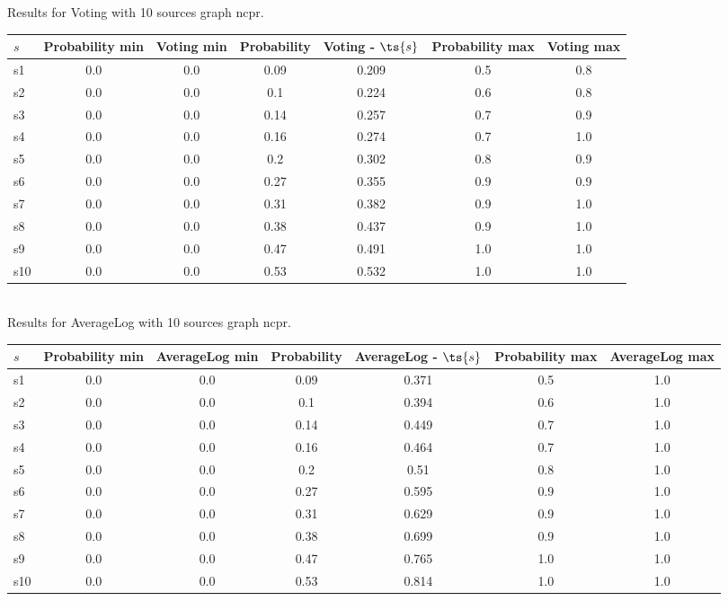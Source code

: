 \documentclass{article}
\begin{document}
\noindent Results for Voting with 10 sources graph ncpr.

\noindent\begin{tabular}{|l|c|c|c|c|c|c|}
\hline
$s$& Probability min & Voting min & Probability & Voting - $\ts{s}$ & Probability max & Voting max\\
\hline
s1 &0.0 & 0.0 & 0.09 & 0.209 & 0.5 & 0.8\\
\hline
s2 &0.0 & 0.0 & 0.1 & 0.224 & 0.6 & 0.8\\
\hline
s3 &0.0 & 0.0 & 0.14 & 0.257 & 0.7 & 0.9\\
\hline
s4 &0.0 & 0.0 & 0.16 & 0.274 & 0.7 & 1.0\\
\hline
s5 &0.0 & 0.0 & 0.2 & 0.302 & 0.8 & 0.9\\
\hline
s6 &0.0 & 0.0 & 0.27 & 0.355 & 0.9 & 0.9\\
\hline
s7 &0.0 & 0.0 & 0.31 & 0.382 & 0.9 & 1.0\\
\hline
s8 &0.0 & 0.0 & 0.38 & 0.437 & 0.9 & 1.0\\
\hline
s9 &0.0 & 0.0 & 0.47 & 0.491 & 1.0 & 1.0\\
\hline
s10 &0.0 & 0.0 & 0.53 & 0.532 & 1.0 & 1.0\\
\hline
\end{tabular}\\

\noindent Results for AverageLog with 10 sources graph ncpr.

\noindent\begin{tabular}{|l|c|c|c|c|c|c|}
\hline
$s$& Probability min & AverageLog min & Probability & AverageLog - $\ts{s}$ & Probability max & AverageLog max\\
\hline
s1 &0.0 & 0.0 & 0.09 & 0.371 & 0.5 & 1.0\\
\hline
s2 &0.0 & 0.0 & 0.1 & 0.394 & 0.6 & 1.0\\
\hline
s3 &0.0 & 0.0 & 0.14 & 0.449 & 0.7 & 1.0\\
\hline
s4 &0.0 & 0.0 & 0.16 & 0.464 & 0.7 & 1.0\\
\hline
s5 &0.0 & 0.0 & 0.2 & 0.51 & 0.8 & 1.0\\
\hline
s6 &0.0 & 0.0 & 0.27 & 0.595 & 0.9 & 1.0\\
\hline
s7 &0.0 & 0.0 & 0.31 & 0.629 & 0.9 & 1.0\\
\hline
s8 &0.0 & 0.0 & 0.38 & 0.699 & 0.9 & 1.0\\
\hline
s9 &0.0 & 0.0 & 0.47 & 0.765 & 1.0 & 1.0\\
\hline
s10 &0.0 & 0.0 & 0.53 & 0.814 & 1.0 & 1.0\\
\hline
\end{tabular}\\
\end{document}
